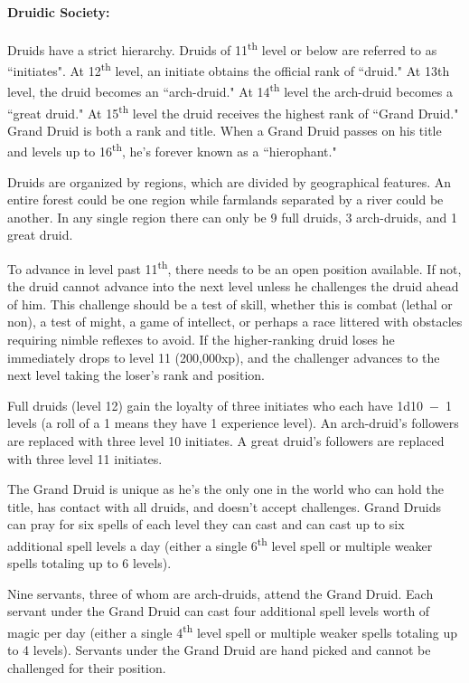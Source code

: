 \begin{multicols}{2}
\paragraph{Druidic Society:} Druids have a strict hierarchy.  Druids of 11\textsuperscript{th} level or below are referred to as ``initiates".  At 12\textsuperscript{th} level, an initiate obtains the official rank of ``druid."  At 13th level, the druid becomes an ``arch-druid."  At 14\textsuperscript{th} level the arch-druid becomes a ``great druid."  At 15\textsuperscript{th} level the druid receives the highest rank of ``Grand Druid."  Grand Druid is both a rank and title.  When a Grand Druid passes on his title and levels up to 16\textsuperscript{th}, he's forever known as a ``hierophant."

Druids are organized by regions, which are divided by geographical features.  An entire forest could be one region while farmlands separated by a river could be another.  In any single region there can only be 9 full druids, 3 arch-druids, and 1 great druid.  

To advance in level past 11\textsuperscript{th}, there needs to be an open position available.  If not, the druid cannot advance into the next level unless he challenges the druid ahead of him.  This challenge should be a test of skill, whether this is combat (lethal or non), a test of might, a game of intellect, or perhaps a race littered with obstacles requiring nimble reflexes to avoid.  If the higher-ranking druid loses he immediately drops to level 11 (200,000xp), and the challenger advances to the next level taking the loser's rank and position.  

Full druids (level 12) gain the loyalty of three initiates who each have 1d10~$-$~1 levels (a roll of a 1 means they have 1 experience level).  An arch-druid's followers are replaced with three level 10 initiates.  A great druid's followers are replaced with three level 11 initiates.

The Grand Druid is unique as he's the only one in the world who can hold the title, has contact with all druids, and doesn't accept challenges.  Grand Druids can pray for six spells of each level they can cast and can cast up to six additional spell levels a day (either a single 6\textsuperscript{th} level spell or multiple weaker spells totaling up to 6 levels).

Nine servants, three of whom are arch-druids, attend the Grand Druid.  Each servant under the Grand Druid can cast four additional spell levels worth of magic per day (either a single 4\textsuperscript{th} level spell or multiple weaker spells totaling up to 4 levels).  Servants under the Grand Druid are hand picked and cannot be challenged for their position.


\end{multicols}
